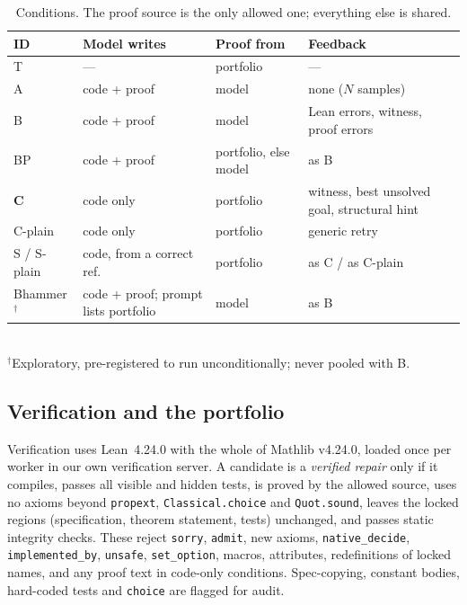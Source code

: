 \documentclass[10pt,twocolumn]{article}
\begin{document}
\begin{table}[t]
\centering\small
\caption{Conditions. The proof source is the only allowed one; everything else is shared.}
\label{tab:conditions}
\begin{tabularx}{\textwidth}{@{}l>{\raggedright\arraybackslash}X>{\raggedright\arraybackslash}X>{\raggedright\arraybackslash}X@{}}
\toprule
ID & Model writes & Proof from & Feedback \\
\midrule
T & --- & portfolio & --- \\
A & code + proof & model & none ($N$ samples) \\
B & code + proof & model & Lean errors, witness, proof errors \\
BP & code + proof & portfolio, else model & as B \\
\textbf{C} & code only & portfolio & witness, best unsolved goal, structural hint \\
C-plain & code only & portfolio & generic retry \\
S / S-plain & code, from a correct ref. & portfolio & as C / as C-plain \\
Bhammer$^\dagger$ & code + proof; prompt lists portfolio & model & as B \\
\bottomrule
\end{tabularx}\\[2pt]
\footnotesize $^\dagger$Exploratory, pre-registered to run unconditionally; never pooled with B.
\end{table}

\subsection{Verification and the portfolio}
Verification uses Lean~4.24.0 with the whole of Mathlib v4.24.0, loaded once per worker in our own
verification server. A candidate is a \emph{verified repair} only if it compiles, passes all visible and hidden
tests, is proved by the allowed source, uses no axioms beyond \texttt{propext}, \texttt{Classical.choice} and
\texttt{Quot.sound}, leaves the locked regions (specification, theorem statement, tests) unchanged, and passes
static integrity checks. These reject \texttt{sorry}, \texttt{admit}, new axioms, \texttt{native\_decide},
\texttt{implemented\_by}, \texttt{unsafe}, \texttt{set\_option}, macros, attributes, redefinitions of locked
names, and any proof text in code-only conditions. Spec-copying, constant bodies, hard-coded tests and
\texttt{choice} are flagged for audit.
\end{document}
